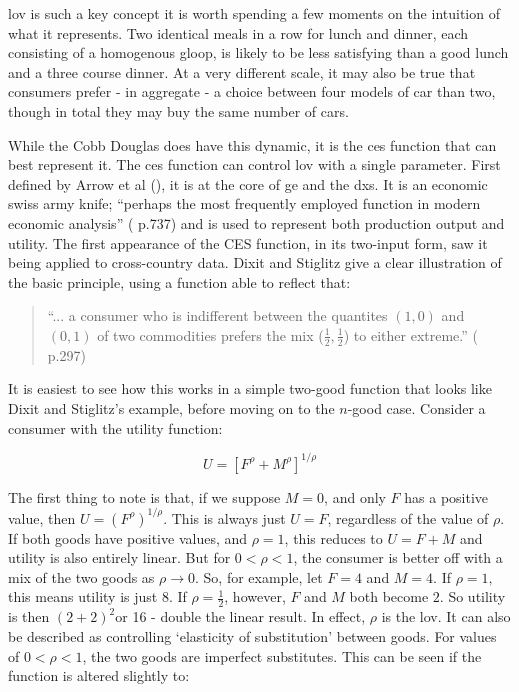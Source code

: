 \Gls{lov} is such a key concept it is worth spending a few moments on the intuition of what it represents. Two identical meals in a row for lunch and dinner, each consisting of a homogenous gloop, is likely to be less satisfying than a good lunch and a three course dinner. At a very different scale, it may also be true that consumers prefer - in aggregate - a choice between four models of car than two, though in total they may buy the same number of cars. 

While the Cobb Douglas does have this dynamic, it is the \gls{ces} function that can best represent it. The \gls{ces} function can control \gls{lov} with a single parameter. First defined by Arrow et al (\citealt{arrow_capital-labor_1961}), it is at the core of \gls{ge} and the \gls{dxs}. It is an economic swiss army knife; ``perhaps the most frequently employed function in modern economic analysis'' (\citealt{durlauf_new_2008} p.737) and is used to represent both production output and utility. The first appearance of the CES function, in its two-input form, saw it being applied to cross-country data. Dixit and Stiglitz give a clear illustration of the basic principle, using a function able to reflect that:

\begin{quote}
``... a consumer who is indifferent between the quantites $(1,0)$ and $(0,1)$ of two commodities prefers the mix ($\frac{1}{2},\frac{1}{2}$) to either extreme.'' (\citealt{dixit_monopolistic_1977} p.297)
\end{quote}

It is easiest to see how this works in a simple two-good function that looks like Dixit and Stiglitz's example, before moving on to the $n$-good case. Consider a consumer with the utility function: 

\begin{equation}
U=\left[F^{\rho}+M^{\rho}\right]^{1/\rho}\label{eq:-4}
\end{equation}

The first thing to note is that, if we suppose $M=0$, and only $F$ has a positive value, then $U=(F^{\rho})^{1/\rho}$. This is always just $U=F$, regardless of the value of $\rho$. If both goods have positive values, and $\rho=1$, this reduces to $U=F+M$ and utility is also entirely linear. But for $0<\rho<1$, the consumer is better off with a mix of the two goods as $\rho\rightarrow0$. So, for example, let $F=4$ and $M=4$. If $\rho=1,$this means utility is just 8. If $\rho=\frac{1}{2}$, however, $F$ and $M$ both become $2$. So utility is then $(2+2)^{2}$or 16 - double the linear result. In effect, $\rho$ is the \gls{lov}. It can also be described as controlling `elasticity of substitution' between goods. For values of $0<\rho<1$, the two goods are imperfect substitutes. This can be seen if the function is altered slightly to:

